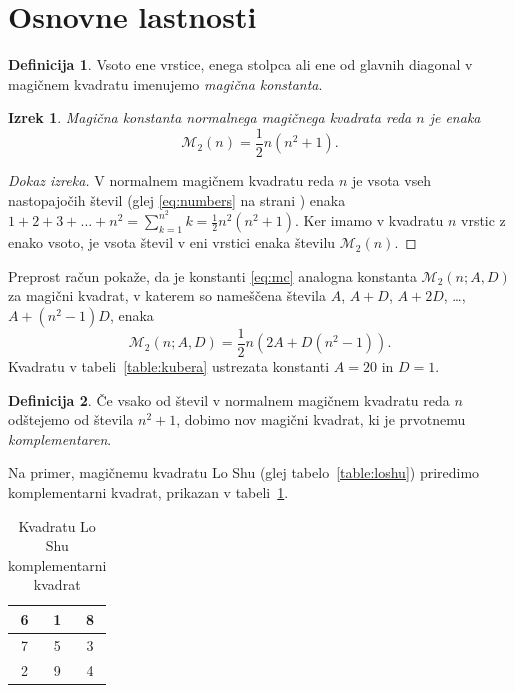 \documentclass[a4paper,12pt]{article}
\newcommand{\m}{\mathcal{M}_2}
\newcommand{\pojem}[1]{\emph{\color{purple}#1}}
\newenvironment{dokaz}{\begin{proof}[Dokaz izreka]}{\end{proof}}
\newenvironment{magic}[3]
{
   \begin{table}[!ht]
   \centering
   \caption{#2}
   \label{#3}
   \large
   \begin{tabular}{|*{#1}{c|}}
   \hline
}
{
   \end{tabular}
   \normalsize
\end{table}
}
\theoremstyle{definition}
\newtheorem{definicija}{Definicija}
\theoremstyle{plain}
\newtheorem{izrek}{Izrek}
\begin{document}


\section{Osnovne lastnosti}

\begin{definicija}
   Vsoto ene vrstice, enega stolpca ali ene od glavnih diagonal
   v magičnem kvadratu imenujemo \pojem{magična konstanta}.
\end{definicija}

\begin{izrek}
   Magična konstanta normalnega magičnega kvadrata reda \(n\)
   je enaka
   \begin{equation}
      \label{eq:mc}
      \m(n) = \frac{1}{2} n(n^2+1).
   \end{equation}
\end{izrek}

\begin{dokaz}
   V normalnem magičnem kvadratu reda \(n\) je vsota vseh nastopajočih
   števil (glej \eqref{eq:numbers} na strani \pageref{eq:numbers}) enaka
   \(1+2+3+\ldots+n^2=\sum_{k=1}^{n^2}k=\frac{1}{2}n^2(n^2+1)\). Ker imamo
   v kvadratu \(n\) vrstic z enako vsoto, je vsota števil v eni vrstici
   enaka številu \(\m(n)\).
\end{dokaz}

Preprost račun pokaže, da je konstanti \eqref{eq:mc} analogna konstanta
\(\m(n;A,D)\) za magični kvadrat, v katerem so nameščena števila
\(A\), \(A+D\), \(A+2D\), \ldots, \(A+(n^2-1)D\), enaka
\[
   \m(n;A,D) = \frac{1}{2} n \left(2A+D(n^2-1)\right).
\]
Kvadratu v tabeli~\ref{table:kubera} ustrezata konstanti \(A=20\) in \(D=1\). %

\begin{definicija}
   Če vsako od števil v normalnem magičnem kvadratu reda \(n\) odštejemo
   od števila \(n^2+1\), dobimo nov magični kvadrat, ki je prvotnemu
   \pojem{komplementaren}.
\end{definicija}

Na primer, magičnemu kvadratu Lo Shu (glej tabelo~\ref{table:loshu}) priredimo
komplementarni kvadrat, prikazan v tabeli~\ref{table:closhu}. %
%
\begin{magic}{3}{Kvadratu Lo Shu komplementarni kvadrat}{table:closhu}
6 & 1 & 8 \\\hline
7 & 5 & 3 \\\hline
2 & 9 & 4 \\\hline
\end{magic}
\end{document}
